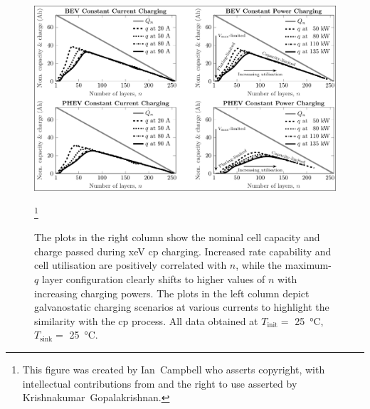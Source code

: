 \begin{figure}[!bp]
    \begin{minipage}[t]{\textwidth}
        \centering \includegraphics[width=\textwidth,trim=4 2 3 4,clip]{fig_capacity_quadrants.pdf}
        \captionsetup{labelsep=note}
        \caption[The plots in the right column show the nominal cell capacity and charge passed
        during \gls{xeV} \gls{cp} charging. Increased rate capability and cell utilisation are positively
        correlated with $n$, while the maximum-$q$ layer configuration clearly shifts to higher
        values of $n$ with increasing charging powers. The plots in the left column depict
        galvanostatic charging scenarios at various currents to highlight the similarity with the
        \gls{cp} process. All data obtained at $T_\text{init} =$ \SI{25}{\degreeCelsius},
        $T_\text{sink} =$ \SI{25}{\degreeCelsius}.]{The plots in the right column show the nominal cell capacity and charge passed
            during \gls{xeV} \gls{cp} charging. Increased rate capability and cell utilisation are positively
            correlated with $n$, while the maximum-$q$ layer configuration clearly shifts to higher
            values of $n$ with increasing charging powers. The plots in the left column depict
            galvanostatic charging scenarios at various currents to highlight the similarity with the
            \gls{cp} process. All data obtained at $T_\text{init} =$ \SI{25}{\degreeCelsius},
        $T_\text{sink} =$ \SI{25}{\degreeCelsius}.}
        \label{fig:fig_CapacityQuadrants}
        \mpfootnotes[1]
        \footnote{This figure was created by \mbox{Ian Campbell} who asserts copyright,
            with intellectual contributions from and the right to use asserted by
        \mbox{Krishnakumar Gopalakrishnan}.}
    \end{minipage}
\end{figure}

